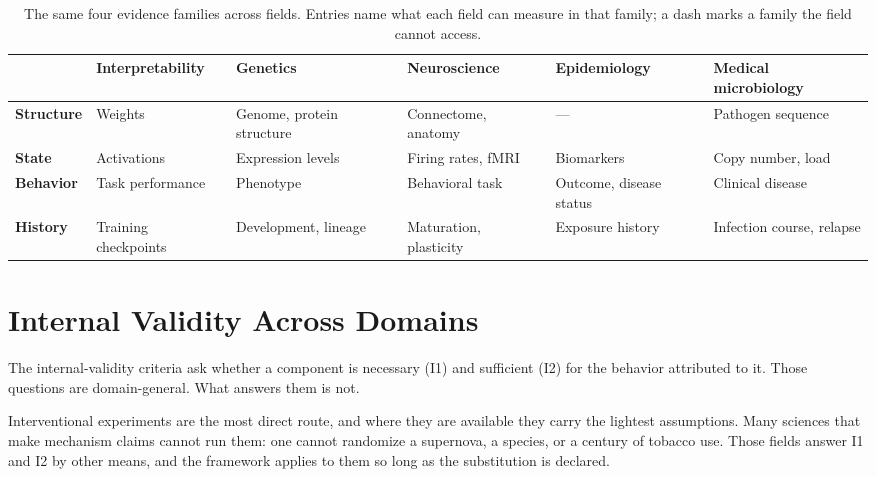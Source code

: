 \documentclass{article}
\begin{document}
\begin{table}[H]
\centering\small
\caption{The same four evidence families across fields. Entries name what each field can measure in that family; a dash marks a family the field cannot access.}
\label{tab:families-domains}
\renewcommand{\arraystretch}{1.2}
\begin{tabular}{@{}l>{\raggedright\arraybackslash}p{2.2cm}>{\raggedright\arraybackslash}p{2.2cm}>{\raggedright\arraybackslash}p{2.2cm}>{\raggedright\arraybackslash}p{2.2cm}>{\raggedright\arraybackslash}p{2.4cm}@{}}
\toprule
& \textbf{Interpretability} & \textbf{Genetics} & \textbf{Neuroscience} & \textbf{Epidemiology} & \textbf{Medical microbiology} \\
\midrule
\textbf{Structure} & Weights & Genome, protein structure & Connectome, anatomy & --- & Pathogen sequence \\
\midrule
\textbf{State} & Activations & Expression levels & Firing rates, fMRI & Biomarkers & Copy number, load \\
\midrule
\textbf{Behavior} & Task performance & Phenotype & Behavioral task & Outcome, disease status & Clinical disease \\
\midrule
\textbf{History} & Training checkpoints & Development, lineage & Maturation, plasticity & Exposure history & Infection course, relapse \\
\bottomrule
\end{tabular}
\end{table}

\section{Internal Validity Across Domains}
\label{app:domains}

The internal-validity criteria ask whether a component is necessary (I1) and
sufficient (I2) for the behavior attributed to it. Those questions are
domain-general. What answers them is not.

Interventional experiments are the most direct route, and where they are
available they carry the lightest assumptions. Many sciences that make
mechanism claims cannot run them: one cannot randomize a supernova, a species,
or a century of tobacco use. Those fields answer I1 and I2 by other means, and
the framework applies to them so long as the substitution is declared.
\end{document}
